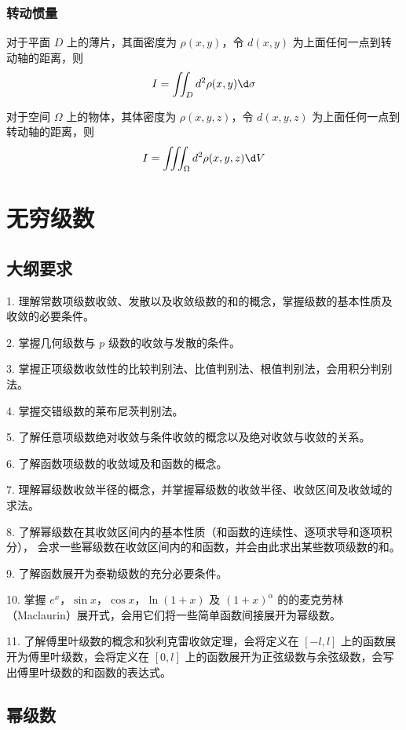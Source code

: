 \subsubsection*{转动惯量}

对于平面 $D$ 上的薄片，其面密度为 $\rho(x, y)$，令 $d(x,y)$ 为上面任何一点到转动轴的距离，则
\[ I = \iint_D d^2 \rho(x, y) \d \sigma \]

对于空间 $\Omega$ 上的物体，其体密度为 $\rho(x, y, z)$，令 $d(x,y,z)$ 为上面任何一点到转动轴的距离，则
\[ I = \iiint_\Omega d^2 \rho(x, y, z) \d V \]

\section{无穷级数}

\subsection{大纲要求}

1. 理解常数项级数收敛、发散以及收敛级数的和的概念，掌握级数的基本性质及收敛的必要条件。

2. 掌握几何级数与 $p$ 级数的收敛与发散的条件。

3. 掌握正项级数收敛性的比较判别法、比值判别法、根值判别法，会用积分判别法。

4. 掌握交错级数的莱布尼茨判别法。

5. 了解任意项级数绝对收敛与条件收敛的概念以及绝对收敛与收敛的关系。

6. 了解函数项级数的收敛域及和函数的概念。

7. 理解幂级数收敛半径的概念，并掌握幂级数的收敛半径、收敛区间及收敛域的求法。

8. 了解幂级数在其收敛区间内的基本性质（和函数的连续性、逐项求导和逐项积分），
会求一些幂级数在收敛区间内的和函数，并会由此求出某些数项级数的和。

9. 了解函数展开为泰勒级数的充分必要条件。

10. 掌握 $e^x$，$\sin x$，$\cos x$，$\ln(1+x)$ 及 $(1+x)^{\alpha}$ 的的麦克劳林（Maclaurin）展开式，会用它们将一些简单函数间接展开为幂级数。

11. 了解傅里叶级数的概念和狄利克雷收敛定理，会将定义在 $[-l, l]$ 上的函数展开为傅里叶级数，会将定义在 $[0, l]$ 上的函数展开为正弦级数与余弦级数，会写出傅里叶级数的和函数的表达式。

\subsection{幂级数}


